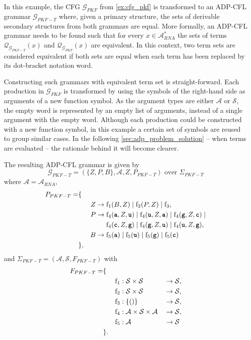 \documentclass[
    a4paper,
    12pt,
    twoside,
    BCOR=12mm,
    parskip=half,
    chapterprefix,
    numbers=noenddot,
    bibliography=totoc
]{scrbook}
\begin{document}
\begin{example}
	\label{ex:treegrammar_pkf}
	In this example, the \gls{CFG} $\mathcal{G}_{PKF}$ from \cref{ex:cfg_pkf} is transformed to an ADP-CFL grammar $\mathcal{G}_{PKF-T}$ where, given a primary structure, the sets of derivable secondary structures from both grammars are equal. More formally, an ADP-CFL grammar needs to be found such that for every $x \in \mathcal{A}^*_{RNA}$ the sets of terms $\mathcal{Q}_{\mathcal{G}_{PKF-T}}(x)$ and $\mathcal{Q}_{\mathcal{G}_{PKF}}(x)$ are equivalent. In this context, two term sets are considered equivalent if both sets are equal when each term has been replaced by its dot-bracket notation word.
	
	Constructing such grammars with equivalent term set is straight-forward. Each production in $\mathcal{G}_{PKF}$ is transformed by using the symbols of the right-hand side as arguments of a new function symbol. As the argument types are either $\mathcal{A}$ or $\mathcal{S}$, the empty word is represented by an empty list of arguments, instead of a single argument with the empty word. Although each production could be constructed with a new function symbol, in this example a certain set of symbols are reused to group similar cases. In the following \cref{sec:adp_problem_solution} -- when terms are evaluated -- the rationale behind it will become clearer.
		
	The resulting ADP-CFL grammar is given by 
	\[ \mathcal{G}_{PKF-T} = (\{Z,P,B\},\mathcal{A},Z,P_{PKF-T}) \text{ over } \Sigma_{PKF-T} \] where $\mathcal{A} = \mathcal{A}_{RNA}$, 
	\begin{align*}
		P_{PKF-T} = &\{&&\\
		&&Z &\to \op{f}_1(B,Z) \mid \op{f}_2(P,Z) \mid \op{f}_3,\\
		&&P &\to \op{f}_4(\ts{a},Z,\ts{u}) \mid \op{f}_4(\ts{u},Z,\ts{a}) \mid \op{f}_4(\ts{g},Z,\ts{c}) \mid\\
		&&  &\mathrel{\phantom{\to}} \op{f}_4(\ts{c},Z,\ts{g}) \mid \op{f}_4(\ts{g},Z,\ts{u}) \mid \op{f}_4(\ts{u},Z,\ts{g}),\\
		&&B &\to \op{f}_5(\ts{a}) \mid \op{f}_5(\ts{u}) \mid \op{f}_5(\ts{g}) \mid \op{f}_5(\ts{c})\\
		&\},&&
	\end{align*}
	and $\Sigma_{PKF-T}=(\mathcal{A},\mathcal{S},F_{PKF-T})$ with \pagebreak
	\begin{align*}
		F_{PKF-T} = &\{&&&&\\
		&&\mathrm{f}_1 &: \mathcal{S} \times \mathcal{S} &&\to \mathcal{S},\\
		&&\mathrm{f}_2 &: \mathcal{S} \times \mathcal{S} &&\to \mathcal{S},\\
		&&\mathrm{f}_3 &: \{()\} &&\to \mathcal{S},\\
		&&\mathrm{f}_4 &: \mathcal{A} \times \mathcal{S} \times \mathcal{A} &&\to \mathcal{S},\\
		&&\mathrm{f}_5 &: \mathcal{A} &&\to \mathcal{S}\\
		&\}.&&&&
	\end{align*}
	

\end{example}
\end{document}
